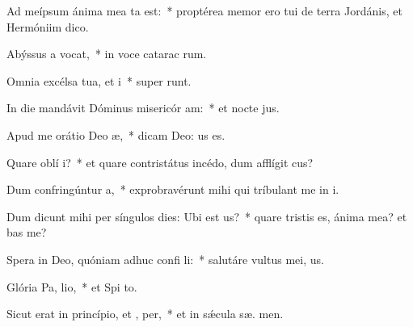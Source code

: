 \item Ad meípsum ánima mea ta est:~* proptérea memor ero tui de terra Jordánis, et Hermóniim   dico.
\item Abýssus a vocat,~* in voce catarac rum.
\item Omnia excélsa tua, et  i~* super  runt.
\item In die mandávit Dóminus misericór am:~* et nocte  jus.
\item Apud me orátio Deo  æ,~* dicam Deo:  us es.
\item Quare oblí  i?~* et quare contristátus incédo, dum afflígit  cus?
\item Dum confringúntur  a,~* exprobravérunt mihi qui tríbulant me in i.
\item Dum dicunt mihi per síngulos dies: Ubi est  us?~* quare tristis es, ánima mea? et  bas me?
\item Spera in Deo, quóniam adhuc confi li:~* salutáre vultus mei,   us.
\item Glória Pa,  lio,~* et Spi to.
\item Sicut erat in princípio, et ,  per,~* et in sǽcula sæ. men.

